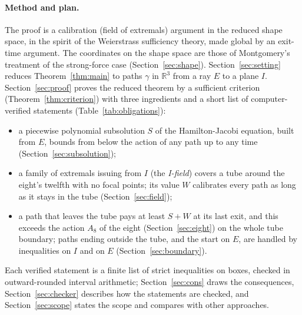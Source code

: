 \documentclass[11pt]{article}
\theoremstyle{definition}
\begin{document}
\paragraph{Method and plan.} The proof is a calibration (field of extremals) argument in the reduced shape space, in
the spirit of the Weierstrass sufficiency theory, made global by an exit-time argument. The coordinates on the shape
space are those of Montgomery's treatment of the strong-force case \cite{Mpants} (Section~\ref{sec:shape}).
Section~\ref{sec:setting}
reduces Theorem~\ref{thm:main} to paths $\gamma$ in $\mathbb R^3$ from a ray $E$ to a plane $I$. Section~\ref{sec:proof}
proves the reduced theorem by a sufficient criterion (Theorem~\ref{thm:criterion}) with three ingredients and a short
list of computer-verified statements (Table~\ref{tab:obligations}):
\begin{itemize}
\item a piecewise polynomial subsolution $S$ of the Hamilton-Jacobi equation, built from $E$, bounds from below the
action of any path up to any time (Section~\ref{sec:subsolution});
\item a family of extremals issuing from $I$ (the \emph{I-field}) covers a tube around the eight's twelfth with no
focal points; its value $W$ calibrates every path as long as it stays in the tube (Section~\ref{sec:field});
\item a path that leaves the tube pays at least $S+W$ at its last exit, and this exceeds the action $A_8$ of the eight
(Section~\ref{sec:eight}) on the whole tube boundary; paths ending outside the tube, and the start on $E$, are handled
by inequalities on $I$ and on $E$ (Section~\ref{sec:boundary}).
\end{itemize}
Each verified statement is a finite list of strict inequalities on boxes, checked in outward-rounded interval
arithmetic; Section~\ref{sec:cons} draws the consequences, Section~\ref{sec:checker} describes how the statements are
checked, and Section~\ref{sec:scope} states the scope and compares with other approaches.
\end{document}

